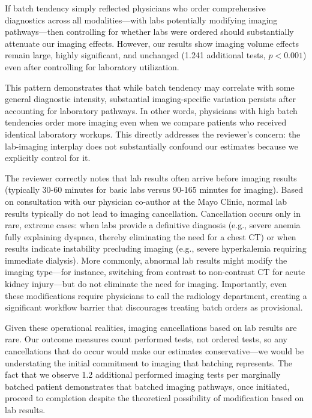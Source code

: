 \documentclass[11pt]{article}
\newcommand{\1}{\hbox{\rm 1\kern-.35em 1}}
\begin{document}
If batch tendency simply reflected physicians who order comprehensive diagnostics across all modalities---with labs potentially modifying imaging pathways---then controlling for whether labs were ordered should substantially attenuate our imaging effects. However, our results show imaging volume effects remain large, highly significant, and unchanged (1.241 additional tests, $p<0.001$) even after controlling for laboratory utilization.

This pattern demonstrates that while batch tendency may correlate with some general diagnostic intensity, substantial imaging-specific variation persists after accounting for laboratory pathways. In other words, physicians with high batch tendencies order more imaging even when we compare patients who received identical laboratory workups. This directly addresses the reviewer's concern: the lab-imaging interplay does not substantially confound our estimates because we explicitly control for it.

The reviewer correctly notes that lab results often arrive before imaging results (typically 30-60 minutes for basic labs versus 90-165 minutes for imaging). Based on consultation with our physician co-author at the Mayo Clinic, normal lab results typically do not lead to imaging cancellation. Cancellation occurs only in rare, extreme cases: when labs provide a definitive diagnosis (e.g., severe anemia fully explaining dyspnea, thereby eliminating the need for a chest CT) or when results indicate instability precluding imaging (e.g., severe hyperkalemia requiring immediate dialysis). More commonly, abnormal lab results might modify the imaging type—for instance, switching from contrast to non-contrast CT for acute kidney injury—but do not eliminate the need for imaging. Importantly, even these modifications require physicians to call the radiology department, creating a significant workflow barrier that discourages treating batch orders as provisional.

Given these operational realities, imaging cancellations based on lab results are rare. Our outcome measures count performed tests, not ordered tests, so any cancellations that do occur would make our estimates conservative—we would be understating the initial commitment to imaging that batching represents. The fact that we observe 1.2 additional performed imaging tests per marginally batched patient demonstrates that  batched imaging pathways, once initiated, proceed to completion despite the theoretical possibility of modification based on lab results.
\end{document}
